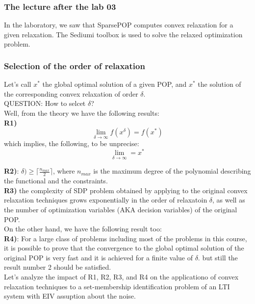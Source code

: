 \subsubsection{The lecture after the lab 03}
In the laboratory, we saw that SparsePOP computes convex relaxation for a given relaxation. The Sediumi toolbox is used to solve the relaxed optimization problem.\\

\subsubsection{Selection of the order of relaxation}
Let's call $x^*$ the global optimal solution of a given POP, and $x^*$ the solution of the corresponding convex relaxation of order $\delta$.\\

QUESTION: How to selcet $\delta$?\\
Well, from the theory we have the following results:\\
\textbf{R1)} 
\[
\lim\limits_{\delta \to \infty} f(x^\delta) = f(x^*)
\]
which implies, the following, to be unprecise:
\[
\lim\limits_{\delta \to \infty} = x^*
\]

\textbf{R2)}: \(\delta) \geq \lceil \frac{n_{max}}{2} \rceil\), where $n_{max}$ is the maximum degree of the polynomial describing the functional and the constraints.\\

\textbf{R3)} the complexity of SDP problem obtained by applying to the original convex relaxation techniques grows exponentially in the order of relaxatoin $\delta$, as well as the number of optimization variables (AKA decision variables) of the original POP.\\

On the other hand, we have the following result too:\\

\textbf{R4)}: For a large class of problems including most of the problems in this course, it is possible to prove that the convergence to the global optimal solution of the original POP is very fast and it is achieved for a finite value of $\delta$. but still the result number 2 should be satisfied.\\

Let's analyze the impact of R1, R2, R3, and R4 on the applicationo of convex relaxation techniques to a set-membership identification problem of an LTI system with EIV assuption about the noise.\\

